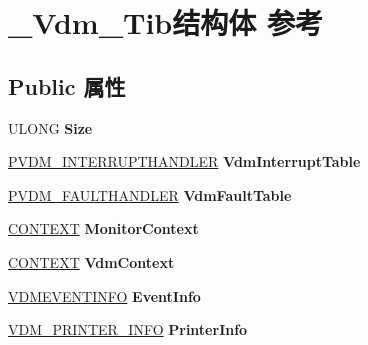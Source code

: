 \hypertarget{struct___vdm___tib}{}\section{\+\_\+\+Vdm\+\_\+\+Tib结构体 参考}
\label{struct___vdm___tib}
\subsection*{Public 属性}
\begin{DoxyCompactItemize}
\item 
\mbox{\label{struct___vdm___tib_a4589e569faa94035a02531155f5f3463}} 
U\+L\+O\+NG {\bfseries Size}
\item 
\mbox{\label{struct___vdm___tib_a42da91517c6d4f9bc553846dd1b2c08e}} 
\hyperlink{struct___vdm___interrupt_handler}{P\+V\+D\+M\+\_\+\+I\+N\+T\+E\+R\+R\+U\+P\+T\+H\+A\+N\+D\+L\+ER} {\bfseries Vdm\+Interrupt\+Table}
\item 
\mbox{\label{struct___vdm___tib_a42df5b07a0f2b9a14631e706082f25be}} 
\hyperlink{struct___vdm___fault_handler}{P\+V\+D\+M\+\_\+\+F\+A\+U\+L\+T\+H\+A\+N\+D\+L\+ER} {\bfseries Vdm\+Fault\+Table}
\item 
\mbox{\label{struct___vdm___tib_a79bce671840490d90fa2d4be9b757016}} 
\hyperlink{struct___c_o_n_t_e_x_t}{C\+O\+N\+T\+E\+XT} {\bfseries Monitor\+Context}
\item 
\mbox{\label{struct___vdm___tib_a497b30929f757fdf5598988de62a08e1}} 
\hyperlink{struct___c_o_n_t_e_x_t}{C\+O\+N\+T\+E\+XT} {\bfseries Vdm\+Context}
\item 
\mbox{\label{struct___vdm___tib_ae4109490acf6c4578373da3a97f43b22}} 
\hyperlink{struct___vdm_event_info}{V\+D\+M\+E\+V\+E\+N\+T\+I\+N\+FO} {\bfseries Event\+Info}
\item 
\mbox{\label{struct___vdm___tib_af11f9c9aad9bb7914e2c1271b77631ec}} 
\hyperlink{struct___vdm___printer___info}{V\+D\+M\+\_\+\+P\+R\+I\+N\+T\+E\+R\+\_\+\+I\+N\+FO} {\bfseries Printer\+Info}
\item 
\mbox{\label{struct___vdm___tib_afaeef1b78ddb83fb9a79f921145c1a9d}} 

\end{DoxyCompactItemize}
